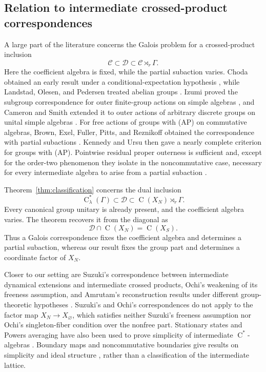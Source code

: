 \documentclass[11pt]{amsart}
\numberwithin{equation}{section}
\newcommand{\rC}{\operatorname{C}}
\theoremstyle{definition}
\begin{document}
	\subsection*{Relation to intermediate crossed-product correspondences}
	A large part of the literature concerns the Galois problem for a crossed-product
	inclusion
	\[
	\mathcal C\subset\mathcal D\subset\mathcal C\rtimes_r\Gamma.
	\]
	Here the coefficient algebra is fixed, while the partial subaction varies. Choda
	obtained an early result under a conditional-expectation hypothesis \cite{Ch80},
	while Landstad, Olesen, and Pedersen treated abelian groups \cite{LOP78}. Izumi
	proved the subgroup correspondence for outer finite-group actions on simple
	algebras \cite{Iz02}, and Cameron and Smith extended it to outer actions of
	arbitrary discrete groups on unital simple algebras \cite{CS19}. For free actions
	of groups with {\rm(AP)} on commutative algebras, Brown, Exel, Fuller, Pitts, and
	Reznikoff obtained the correspondence with partial subactions \cite{BEFPR21}.
	Kennedy and Ursu then gave a
	nearly complete criterion for groups with {\rm(AP)}. Pointwise residual proper
	outerness is sufficient and, except for the order-two phenomenon they isolate
	in the noncommutative case, necessary for every intermediate algebra to arise
	from a partial subaction \cite{KU24}.

	Theorem~\ref{thm:classification} concerns the dual inclusion
	\[
	\rC^*_{\lambda}(\Gamma)\subset\mathcal D
	\subset\rC(X_N)\rtimes_r\Gamma.
	\]
	Every canonical group unitary is already present, and the coefficient algebra
	varies. The theorem recovers it from the diagonal as
	\[
	\mathcal D\cap\rC(X_N)=\rC(X_S).
	\]
	Thus a Galois correspondence fixes the coefficient algebra and determines a
	partial subaction, whereas our result fixes the group part and determines a
	coordinate factor of \(X_N\).

	Closer to our setting are Suzuki's correspondence between intermediate
	dynamical extensions and intermediate crossed products, Ochi's weakening of its
	freeness assumption, and Amrutam's reconstruction results under different
	group-theoretic hypotheses \cite{Su20,Oc21,Am21}. Suzuki's and Ochi's
	correspondences do not apply to the factor map \(X_N\to X_\varnothing\), which
	satisfies neither Suzuki's freeness assumption nor Ochi's singleton-fiber
	condition over the nonfree part.
	Stationary states and Powers averaging have also been used to prove simplicity
	of intermediate \(\rC^*\)-algebras \cite{AK20,AU22}. Boundary maps and
	noncommutative boundaries give results on simplicity and ideal structure
	\cite{KS22,KS19}, rather than a classification of the intermediate lattice.
\end{document}
